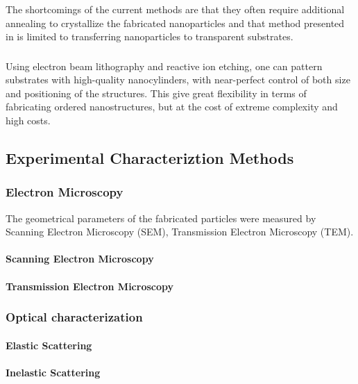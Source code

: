                 The shortcomings of the current methods are that they often require additional annealing to crystallize the fabricated nanoparticles and that
            method presented in \cite{zywietz2014laser} is limited to transferring nanoparticles to transparent substrates.

        \subsubsection{}
                Using electron beam lithography and reactive ion etching, one can pattern substrates with high-quality nanocylinders, with near-perfect
            control of both size and positioning of the structures\cite{bakker2015magnetic}. This give great flexibility in terms of fabricating ordered nanostructures, but at the
            cost of extreme complexity and high costs.

    \subsection{Experimental Characteriztion Methods}
        \subsubsection{Electron Microscopy}
            \label{sec:ElectronMicroscopy}
                    The geometrical parameters of the fabricated particles were measured by Scanning Electron Microscopy (SEM),
                Transmission Electron Microscopy (TEM).
            \paragraph{Scanning Electron Microscopy}
            \paragraph{Transmission Electron Microscopy}

        \subsubsection{Optical characterization}
            \paragraph{Elastic Scattering}
            \paragraph{Inelastic Scattering}

